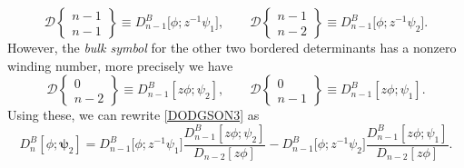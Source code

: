 \documentclass[pdftex]{sigma}
\numberwithin{equation}{section}
\begin{document}
	\begin{equation}\label{easy btds}
		\mathscr{D}\left\lbrace \begin{matrix} n-1 \\ n-1 \end{matrix} \right\rbrace \equiv D^B_{n-1}\big[\phi;z^{-1}\psi_1\big], \qquad \mathscr{D}\left\lbrace \begin{matrix} n-1 \\ n-2 \end{matrix} \right\rbrace \equiv D^B_{n-1}\big[\phi;z^{-1}\psi_2\big].
	\end{equation}
	However, the \textit{bulk symbol} for the other two bordered determinants has a nonzero winding number, more precisely we have
	\begin{equation}\label{harder btds}
		\mathscr{D}\left\lbrace \begin{matrix} 0 \\ n-2 \end{matrix} \right\rbrace \equiv D^B_{n-1}[z\phi;\psi_2], \qquad \mathscr{D}\left\lbrace \begin{matrix} 0 \\ n-1 \end{matrix} \right\rbrace \equiv D^B_{n-1}[z\phi;\psi_1].
	\end{equation}
	Using these, we can rewrite \eqref{DODGSON3} as
	\begin{equation}\label{Dodgson 2-bordered}
		D^B_n[\phi;\boldsymbol{\psi}_2] = D^B_{n-1}\big[\phi;z^{-1}\psi_1\big] \frac{D^B_{n-1}[z\phi;\psi_2]}{D_{n-2}[z \phi]} - D^B_{n-1}\big[\phi;z^{-1}\psi_2\big] \frac{D^B_{n-1}[z\phi;\psi_1]}{D_{n-2}[z \phi]}.
	\end{equation}
	
\end{document}
